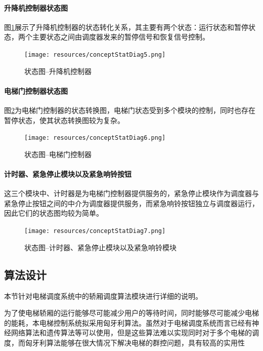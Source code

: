 \paragraph{升降机控制器状态图}
图\ref{fig:conceptStatDiag5}展示了升降机控制器的状态转化关系，其主要有两个状态：运行状态和暂停状态，两个主要状态之间由调度器发来的暂停信号和恢复信号控制。
\begin{figure}[H]
	\centering
	\texttt{[image: resources/conceptStatDiag5.png]}
	\caption{状态图--升降机控制器}
	\label{fig:conceptStatDiag5}
\end{figure}

\paragraph{电梯门控制器状态图}
图\ref{fig:conceptStatDiag6}为电梯门控制器的状态转换图，电梯门状态受到多个模块的控制，同时也存在暂停状态，使其状态转换图较为复杂。
\begin{figure}[H]
	\centering
	\texttt{[image: resources/conceptStatDiag6.png]}
	\caption{状态图--电梯门控制器}
	\label{fig:conceptStatDiag6}
\end{figure}

\paragraph{计时器、紧急停止模块以及紧急响铃按钮}
这三个模块中、计时器是为电梯门控制器提供服务的，紧急停止模块作为调度器与紧急停止按钮之间的中介为调度器提供服务，而紧急响铃按钮独立与调度器运行，因此它们的状态图均较为简单。
\begin{figure}[H]
	\centering
	\texttt{[image: resources/conceptStatDiag7.png]}
	\caption{状态图--计时器、紧急停止模块以及紧急响铃模块}
	\label{fig:conceptStatDiag7}
\end{figure}

\subsection{算法设计}
本节针对电梯调度系统中的轿厢调度算法模块进行详细的说明。\par

为了使电梯轿厢的运行能够尽可能减少用户的等待时间，同时能够尽可能减少电梯的能耗，本电梯控制系统拟采用匈牙利算法。虽然对于电梯调度系统而言已经有神经网络算法和遗传算法等可以使用，但是这些算法难以实现同时对于多个电梯的调度，而匈牙利算法能够在很大情况下解决电梯的群控问题，具有较高的实用性

